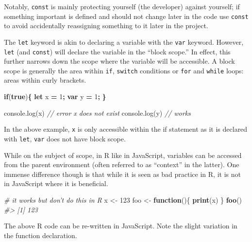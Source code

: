 \documentclass[10pt,]{krantz}
\makeatletter
\newenvironment{Shaded}{\begin{snugshade}}{\end{snugshade}}
\newcommand{\AttributeTok}[1]{\textcolor[rgb]{0.61,0.61,0.61}{#1}}
\newcommand{\CommentTok}[1]{\textcolor[rgb]{0.37,0.37,0.37}{\textit{#1}}}
\newcommand{\ControlFlowTok}[1]{\textcolor[rgb]{0.27,0.27,0.27}{\textbf{#1}}}
\newcommand{\DecValTok}[1]{\textcolor[rgb]{0.06,0.06,0.06}{#1}}
\newcommand{\KeywordTok}[1]{\textcolor[rgb]{0.27,0.27,0.27}{\textbf{#1}}}
\newcommand{\NormalTok}[1]{#1}
\newcommand{\OperatorTok}[1]{\textcolor[rgb]{0.43,0.43,0.43}{\textbf{#1}}}
\newcommand{\StringTok}[1]{\textcolor[rgb]{0.5,0.5,0.5}{#1}}
\newcommand{\VariableTok}[1]{\textcolor[rgb]{0,0,0}{#1}}
\newenvironment{kframe}{%
\medskip{}
\setlength{\fboxsep}{.8em}
 \def\at@end@of@kframe{}%
 \ifinner\ifhmode%
  \def\at@end@of@kframe{\end{minipage}}%
  \begin{minipage}{\columnwidth}%
 \fi\fi%
 \def\FrameCommand##1{\hskip\@totalleftmargin \hskip-\fboxsep
 \colorbox{shadecolor}{##1}\hskip-\fboxsep
     \hskip-\linewidth \hskip-\@totalleftmargin \hskip\columnwidth}%
 \MakeFramed {\advance\hsize-\width
   \@totalleftmargin\z@ \linewidth\hsize
   \@setminipage}}%
 {\par\unskip\endMakeFramed%
 \at@end@of@kframe}
\renewenvironment{Shaded}{\begin{kframe}}{\end{kframe}}
\makeatother
\begin{document}
Notably, \texttt{const} is mainly protecting yourself (the developer) against yourself; if something important is defined and should not change later in the code use \texttt{const} to avoid accidentally reassigning something to it later in the project.

The \texttt{let} keyword is akin to declaring a variable with the \texttt{var} keyword. However, \texttt{let} (and \texttt{const}) will declare the variable in the ``block scope.'' In effect, this further narrows down the scope where the variable will be accessible. A block scope is generally the area within \texttt{if}, \texttt{switch} conditions or \texttt{for} and \texttt{while} loops: areas within curly brackets.

\begin{Shaded}
\begin{Highlighting}[]
\ControlFlowTok{if}\NormalTok{(}\KeywordTok{true}\NormalTok{)}\OperatorTok{\{}
  \KeywordTok{let}\NormalTok{ x }\OperatorTok{=} \DecValTok{1}\OperatorTok{;}
  \KeywordTok{var}\NormalTok{ y }\OperatorTok{=} \DecValTok{1}\OperatorTok{;}
\OperatorTok{\}}

\VariableTok{console}\NormalTok{.}\AttributeTok{log}\NormalTok{(x) }\CommentTok{// error x does not exist}
\VariableTok{console}\NormalTok{.}\AttributeTok{log}\NormalTok{(y) }\CommentTok{// works}
\end{Highlighting}
\end{Shaded}

In the above example, \texttt{x} is only accessible within the if statement as it is declared with \texttt{let}, \texttt{var} does not have block scope.

While on the subject of scope, in R like in JavaScript, variables can be accessed from the parent environment (often referred to as ``context'' in the latter). One immense difference though is that while it is seen as bad practice in R, it is not in JavaScript where it is beneficial.

\begin{Shaded}
\begin{Highlighting}[]
\CommentTok{# it works but don't do this in R}
\NormalTok{x <-}\StringTok{ }\DecValTok{123}
\NormalTok{foo <-}\StringTok{ }\ControlFlowTok{function}\NormalTok{()\{}
  \KeywordTok{print}\NormalTok{(x)}
\NormalTok{\}}
\KeywordTok{foo}\NormalTok{()}
\CommentTok{#> [1] 123}
\end{Highlighting}
\end{Shaded}

The above R code can be re-written in JavaScript. Note the slight variation in the function declaration.
\end{document}
